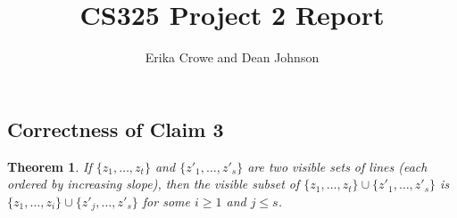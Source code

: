 \documentclass{article}
\title{CS325 Project 2 Report}
\author{Erika Crowe and Dean Johnson}
\newtheorem{theorem}{Theorem}
\begin{document}
\maketitle




\subsection*{Correctness of Claim 3}

\begin{theorem}
If $\{z_{1},\ldots,z_{t}\}$ and $\{z'_{1},\ldots,z'_{s}\}$ are two visible sets of lines (each ordered by increasing slope), then the visible subset of $\{z_{1},\ldots,z_{t}\} \cup \{z'_{1},\ldots,z'_{s}\}$ is $\{z_{1},\ldots,z_{i}\} \cup \{z'_{j},\ldots,z'_{s}\}$ for some $i \geq 1$ and $j \leq s$.
\end{theorem}
\end{document}
